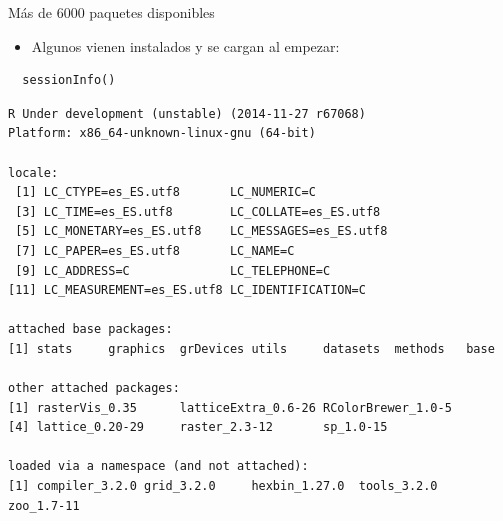 \documentclass[xcolor={usenames,svgnames,dvipsnames}]{beamer}
\begin{document}
\begin{frame}[fragile,label=sec-1-3-3]{Más de 6000 paquetes disponibles}
 \begin{itemize}
\item Algunos vienen instalados y se cargan al empezar:
\end{itemize}
\lstset{language=R,label= ,caption= ,numbers=none}
\begin{lstlisting}
  sessionInfo()
\end{lstlisting}

\begin{verbatim}
R Under development (unstable) (2014-11-27 r67068)
Platform: x86_64-unknown-linux-gnu (64-bit)

locale:
 [1] LC_CTYPE=es_ES.utf8       LC_NUMERIC=C             
 [3] LC_TIME=es_ES.utf8        LC_COLLATE=es_ES.utf8    
 [5] LC_MONETARY=es_ES.utf8    LC_MESSAGES=es_ES.utf8   
 [7] LC_PAPER=es_ES.utf8       LC_NAME=C                
 [9] LC_ADDRESS=C              LC_TELEPHONE=C           
[11] LC_MEASUREMENT=es_ES.utf8 LC_IDENTIFICATION=C      

attached base packages:
[1] stats     graphics  grDevices utils     datasets  methods   base     

other attached packages:
[1] rasterVis_0.35      latticeExtra_0.6-26 RColorBrewer_1.0-5 
[4] lattice_0.20-29     raster_2.3-12       sp_1.0-15          

loaded via a namespace (and not attached):
[1] compiler_3.2.0 grid_3.2.0     hexbin_1.27.0  tools_3.2.0    zoo_1.7-11
\end{verbatim}
\end{frame}
\end{document}
